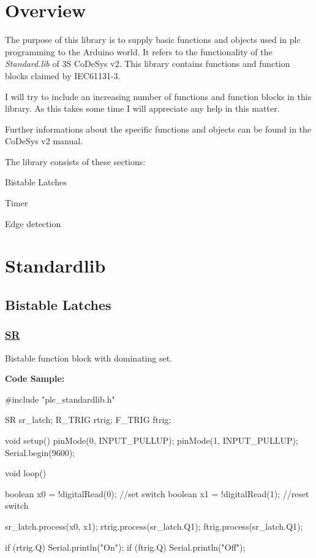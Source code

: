 \section*{Overview}

The purpose of this library is to supply basic functions and objects used in plc programming to the Arduino world. It refers to the functionality of the {\itshape Standard.\+lib} of 3\+S Co\+De\+Sys v2. This library contains functions and function blocks claimed by I\+E\+C61131-\/3.

I will try to include an increasing number of functions and function blocks in this library. As this takes some time I will appreciate any help in this matter.

Further informations about the specific functions and objects can be found in the Co\+De\+Sys v2 manual.

The library consists of these sections\+:


\begin{DoxyItemize}
\item Bistable Latches
\item Timer
\item Edge detection
\end{DoxyItemize}

\section*{Standardlib}

\subsection*{Bistable Latches}

\subsubsection*{\hyperlink{class_s_r}{S\+R}}

Bistable function block with dominating set.

{\bfseries Code Sample\+:} \begin{DoxyVerb}#include "plc_standardlib.h"

SR sr_latch;
R_TRIG rtrig;
F_TRIG ftrig;

void setup() {
    pinMode(0, INPUT_PULLUP);
    pinMode(1, INPUT_PULLUP);
    Serial.begin(9600);
}

void loop() {
    boolean x0 = !digitalRead(0); //set switch
    boolean x1 = !digitalRead(1); //reset switch

    sr_latch.process(x0, x1);
    rtrig.process(sr_latch.Q1);
    ftrig.process(sr_latch.Q1);

    if (rtrig.Q) {
        Serial.println("On");
    }
    if (ftrig.Q) {
        Serial.println("Off");
    }
}
\end{DoxyVerb}


